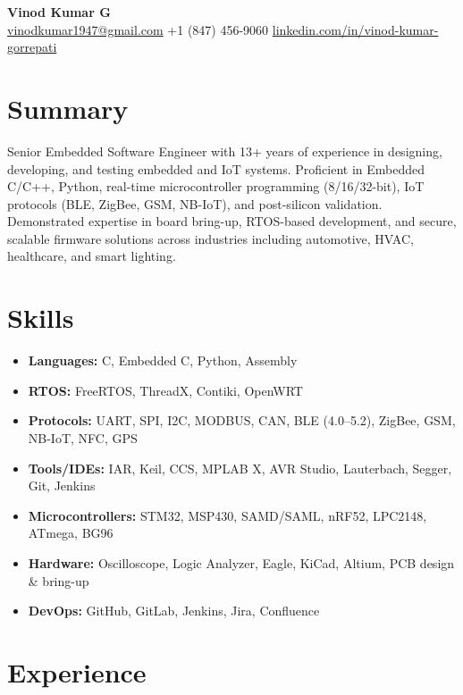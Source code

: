 \documentclass[10pt]{article}
\begin{document}
\begin{center}
    {\LARGE \textbf{Vinod Kumar G}} \\
    \href{mailto:vinodkumar1947@gmail.com}{vinodkumar1947@gmail.com} \quad
    +1 (847) 456-9060 \quad
    \href{https://www.linkedin.com/in/vinod-kumar-gorrepati}{linkedin.com/in/vinod-kumar-gorrepati} \\
    \vspace{0.2cm}
\end{center}

\section*{Summary}
Senior Embedded Software Engineer with 13+ years of experience in designing, developing, and testing embedded and IoT systems. Proficient in Embedded C/C++, Python, real-time microcontroller programming (8/16/32-bit), IoT protocols (BLE, ZigBee, GSM, NB-IoT), and post-silicon validation. Demonstrated expertise in board bring-up, RTOS-based development, and secure, scalable firmware solutions across industries including automotive, HVAC, healthcare, and smart lighting.

\section*{Skills}
\begin{itemize}[leftmargin=*]
  \item \textbf{Languages:} C, Embedded C, Python, Assembly
  \item \textbf{RTOS:} FreeRTOS, ThreadX, Contiki, OpenWRT
  \item \textbf{Protocols:} UART, SPI, I2C, MODBUS, CAN, BLE (4.0–5.2), ZigBee, GSM, NB-IoT, NFC, GPS
  \item \textbf{Tools/IDEs:} IAR, Keil, CCS, MPLAB X, AVR Studio, Lauterbach, Segger, Git, Jenkins
  \item \textbf{Microcontrollers:} STM32, MSP430, SAMD/SAML, nRF52, LPC2148, ATmega, BG96
  \item \textbf{Hardware:} Oscilloscope, Logic Analyzer, Eagle, KiCad, Altium, PCB design & bring-up
  \item \textbf{DevOps:} GitHub, GitLab, Jenkins, Jira, Confluence
\end{itemize}

\section*{Experience}
\end{document}
